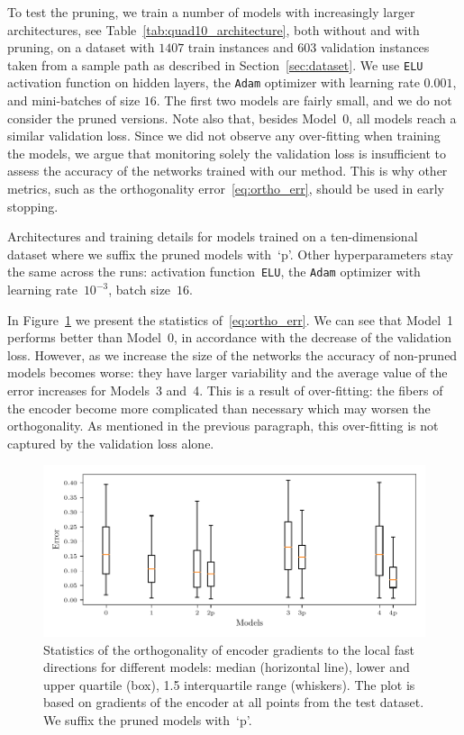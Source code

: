 \documentclass{article}
\begin{document}
To test the pruning, we train a number of models with increasingly larger architectures, see Table~\ref{tab:quad10_architecture}, both without and with pruning, on a dataset with $1407$ train instances and $603$ validation instances taken from a sample path as described in Section~\ref{sec:dataset}. We use \texttt{ELU} activation function on hidden layers, the \texttt{Adam} optimizer with learning rate $0.001$, and mini-batches of size $16$. The first two models are fairly small, and we do not consider the pruned versions. Note also that, besides Model~0, all models reach a similar validation loss. Since we did not observe any over-fitting when training the models, we argue that monitoring solely the validation loss is insufficient to assess the accuracy of the networks trained with our method. This is why other metrics, such as the orthogonality error~\eqref{eq:ortho_err}, should be used in early stopping.

\begin{table}
    \centering
    \medskip
    \caption{Architectures and training details for models trained on a ten-dimensional dataset where we suffix the pruned models with~`p'. Other hyperparameters stay the same across the runs: activation function~\texttt{ELU}, the \texttt{Adam} optimizer with learning rate~$10^{-3}$, batch size~$16$.}
    \label{tab:quad10_architecture}
\end{table}

In Figure~\ref{fig:quad10d_enc_err_derivatives} we present the statistics of~\eqref{eq:ortho_err}. We can see that Model~1 performs better than Model~0, in accordance with the decrease of the validation loss. However, as we increase the size of the networks the accuracy of non-pruned models becomes worse: they have larger variability and the average value of the error increases for Models~3 and~4. This is a result of over-fitting: the fibers of the encoder become more complicated than necessary which may worsen the orthogonality. As mentioned in the previous paragraph, this over-fitting is not captured by the validation loss alone.

\begin{figure}
    \centering
    \includegraphics[width=\textwidth]{figs/quad10d_enc_err_derivatives.pdf}
    \caption{Statistics of the orthogonality of encoder gradients to the local fast directions for different models: median (horizontal line), lower and upper quartile (box), 1.5 interquartile range (whiskers). The plot is based on gradients of the encoder at all points from the test dataset. We suffix the pruned models with~`p'.}
    \label{fig:quad10d_enc_err_derivatives}
\end{figure}
\end{document}
